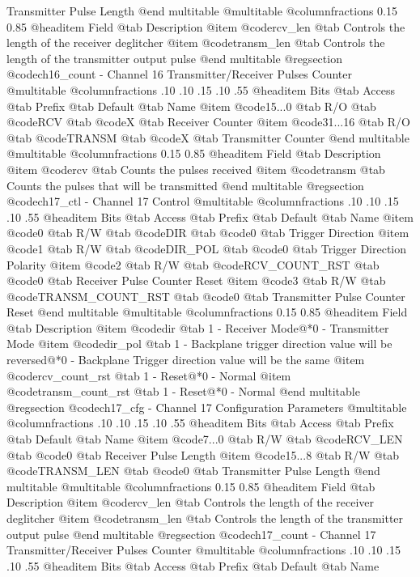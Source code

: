 Transmitter Pulse Length
@end multitable
@multitable @columnfractions 0.15 0.85
@headitem Field @tab Description
@item @code{rcv_len} @tab Controls the length of the receiver deglitcher
@item @code{transm_len} @tab Controls the length of the transmitter output pulse
@end multitable
@regsection @code{ch16_count} - Channel 16 Transmitter/Receiver Pulses Counter
@multitable @columnfractions .10 .10 .15 .10 .55
@headitem Bits @tab Access @tab Prefix @tab Default @tab Name
@item @code{15...0}
@tab R/O @tab
@code{RCV}
@tab @code{X} @tab 
Receiver Counter
@item @code{31...16}
@tab R/O @tab
@code{TRANSM}
@tab @code{X} @tab 
Transmitter Counter
@end multitable
@multitable @columnfractions 0.15 0.85
@headitem Field @tab Description
@item @code{rcv} @tab Counts the pulses received
@item @code{transm} @tab Counts the pulses that will be transmitted
@end multitable
@regsection @code{ch17_ctl} - Channel 17 Control
@multitable @columnfractions .10 .10 .15 .10 .55
@headitem Bits @tab Access @tab Prefix @tab Default @tab Name
@item @code{0}
@tab R/W @tab
@code{DIR}
@tab @code{0} @tab 
Trigger Direction
@item @code{1}
@tab R/W @tab
@code{DIR_POL}
@tab @code{0} @tab 
Trigger Direction Polarity
@item @code{2}
@tab R/W @tab
@code{RCV_COUNT_RST}
@tab @code{0} @tab 
Receiver Pulse Counter Reset
@item @code{3}
@tab R/W @tab
@code{TRANSM_COUNT_RST}
@tab @code{0} @tab 
Transmitter Pulse Counter Reset
@end multitable
@multitable @columnfractions 0.15 0.85
@headitem Field @tab Description
@item @code{dir} @tab 1 - Receiver Mode@*0 - Transmitter Mode
@item @code{dir_pol} @tab 1 - Backplane trigger direction value will be reversed@*0 - Backplane Trigger direction value will be the same
@item @code{rcv_count_rst} @tab 1 - Reset@*0 - Normal
@item @code{transm_count_rst} @tab 1 - Reset@*0 - Normal
@end multitable
@regsection @code{ch17_cfg} - Channel 17 Configuration Parameters
@multitable @columnfractions .10 .10 .15 .10 .55
@headitem Bits @tab Access @tab Prefix @tab Default @tab Name
@item @code{7...0}
@tab R/W @tab
@code{RCV_LEN}
@tab @code{0} @tab 
Receiver Pulse Length
@item @code{15...8}
@tab R/W @tab
@code{TRANSM_LEN}
@tab @code{0} @tab 
Transmitter Pulse Length
@end multitable
@multitable @columnfractions 0.15 0.85
@headitem Field @tab Description
@item @code{rcv_len} @tab Controls the length of the receiver deglitcher
@item @code{transm_len} @tab Controls the length of the transmitter output pulse
@end multitable
@regsection @code{ch17_count} - Channel 17 Transmitter/Receiver Pulses Counter
@multitable @columnfractions .10 .10 .15 .10 .55
@headitem Bits @tab Access @tab Prefix @tab Default @tab Name
